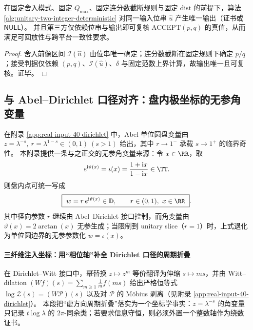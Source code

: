 \begin{proposition}\label{prop:unitary-two-integer-reproducible}
在固定舍入模式、固定 \(Q_{\max}\)、固定连分数截断规则与固定 \(\mathrm{dist}\) 的前提下，算法 \ref{alg:unitary-two-integer-deterministic} 对同一输入位串 \(\widehat u\) 产生唯一输出（证书或 \(\mathsf{NULL}\)）。
并且第三方仅依赖位串与输出即可复核 \(\mathrm{ACCEPT}(p,q)\) 的真值，从而满足可回放性与跨平台一致性要求。
\end{proposition}
\begin{proof}
舍入前像区间 \(\mathcal{I}(\widehat u)\) 由位串唯一确定；连分数截断在固定规则下确定 \(p/q\)；接受判据仅依赖 \((p,q)\)、\(\mathcal{I}(\widehat u)\)、\(\delta\) 与固定范数上界计算，故输出唯一且可复核。证毕。
\end{proof}

\subsection{与 Abel--Dirichlet 口径对齐：盘内极坐标的无参角变量}\label{subsec:unit-circle-phase-abel-dirichlet}
在附录 \ref{app:real-input-40-dirichlet} 中，Abel 单位圆盘变量由
\(
z=\lambda^{-s},\ r=\lambda^{1-s}\in(0,1)\ (s>1)
\)
给出，其中 \(r\to 1^{-}\) 承载 \(s\to 1^{+}\) 的临界奇性。
本附录提供一条与之正交的无参角变量来源：令 \(x\in\RR\)，取
\[
e^{\mathrm{i}\vartheta(x)}=\iota(x)=\frac{1+\mathrm{i}x}{1-\mathrm{i}x}\in\TT.
\]
则盘内点可统一写成
\begin{equation}\label{eq:unit-circle-phase-disk-polar}
\boxed{\ w=r\,e^{\mathrm{i}\vartheta(x)}\in\mathbb{D},\qquad r\in(0,1),\ x\in\RR\ }.
\end{equation}
其中径向参数 \(r\) 继续由 Abel--Dirichlet 接口控制，而角变量由 \(\vartheta(x)=2\arctan(x)\) 无参生成；当限制到 unitary slice（\(r=1\)）时，上式退化为单位圆边界的无参参数化 \(w=\iota(x)\)。

\paragraph{三纤维注入坐标：用“相位轴”补全 Dirichlet 口径的周期折叠}
在 Dirichlet--Witt 接口中，幂替换 \(z\mapsto z^{m}\) 等价翻译为伸缩 \(s\mapsto ms\)，并由 Witt--dilation
\(
(Wf)(s)=\sum_{m\ge 1}\frac{1}{m}f(ms)
\)
给出严格恒等式 \(\log\mathcal{Z}(s)=(W\mathcal{P})(s)\) 以及对 \(\mathcal{P}\) 的 Möbius 剥离（见附录 \ref{app:real-input-40-dirichlet}）。
本段把“虚方向周期折叠”落实为一个坐标学事实：\(z=\lambda^{-s}\) 的角变量只记录 \(t\log\lambda\) 的 \(2\pi\)-同余类；若要求信息守恒，则必须外置一个整数轴作为绕数证书。

